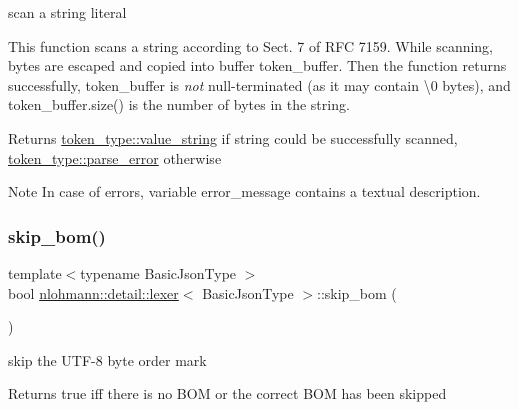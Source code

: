 scan a string literal 

This function scans a string according to Sect. 7 of R\+FC 7159. While scanning, bytes are escaped and copied into buffer token\+\_\+buffer. Then the function returns successfully, token\+\_\+buffer is {\itshape not} null-\/terminated (as it may contain \textbackslash{}0 bytes), and token\+\_\+buffer.\+size() is the number of bytes in the string.

\begin{DoxyReturn}{Returns}
\mbox{\hyperlink{classnlohmann_1_1detail_1_1lexer_a3f313cdbe187cababfc5e06f0b69b098a2b490e8bf366b4cbe3ebd99b26ce15ce}{token\+\_\+type\+::value\+\_\+string}} if string could be successfully scanned, \mbox{\hyperlink{classnlohmann_1_1detail_1_1lexer_a3f313cdbe187cababfc5e06f0b69b098a456e19aeafa334241c7ff3f589547f9d}{token\+\_\+type\+::parse\+\_\+error}} otherwise
\end{DoxyReturn}
\begin{DoxyNote}{Note}
In case of errors, variable error\+\_\+message contains a textual description. 
\end{DoxyNote}
\mbox{\label{classnlohmann_1_1detail_1_1lexer_a709afd52def2e258dac0b8a67dc4ea26}} 
\subsubsection{\texorpdfstring{skip\_bom()}{skip\_bom()}}
{\footnotesize\ttfamily template$<$typename Basic\+Json\+Type $>$ \\
bool \mbox{\hyperlink{classnlohmann_1_1detail_1_1lexer}{nlohmann\+::detail\+::lexer}}$<$ Basic\+Json\+Type $>$\+::skip\+\_\+bom (\begin{DoxyParamCaption}{ }\end{DoxyParamCaption})\hspace{0.3cm}{\ttfamily [inline]}}



skip the U\+T\+F-\/8 byte order mark 

\begin{DoxyReturn}{Returns}
true iff there is no B\+OM or the correct B\+OM has been skipped 
\end{DoxyReturn}
\mbox{\label{classnlohmann_1_1detail_1_1lexer_a1a2d4cc5d9fed4783aa2a98497925511}} 
